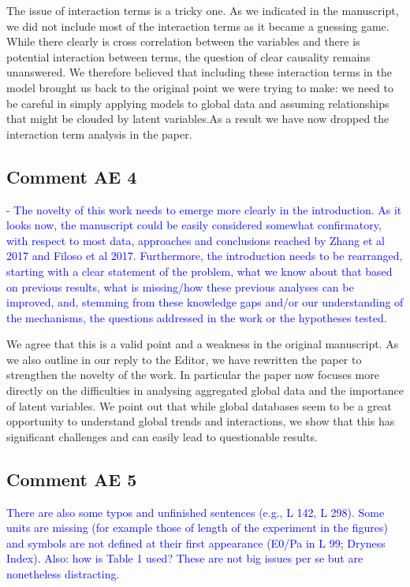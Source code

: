 \documentclass[]{elsarticle} %
\begin{document}
The issue of interaction terms is a tricky one. As we indicated in the manuscript, we did not include most of the interaction terms as it became a guessing game. While there clearly is cross correlation between the variables and there is potential interaction between terms, the question of clear causality remains unanswered. We therefore believed that including these interaction terms in the model brought us back to the original point we were trying to make: we need to be careful in simply applying models to global data and assuming relationships that might be clouded by latent variables.As a result we have now dropped the interaction term analysis in the paper.

\hypertarget{comment-ae-4}{%
\subsection{Comment AE 4}\label{comment-ae-4}}

\textcolor{blue}{- The novelty of this work needs to emerge more clearly in the introduction. As it looks now, the manuscript could be easily considered somewhat confirmatory, with respect to most data, approaches and conclusions reached by Zhang et al 2017 and Filoso et al 2017. Furthermore, the introduction needs to be rearranged, starting with a clear statement of the problem, what we know about that based on previous results, what is missing/how these previous analyses can be improved, and, stemming from these knowledge gaps and/or our understanding of the mechanisms, the questions addressed in the work or the hypotheses tested.}

We agree that this is a valid point and a weakness in the original manuscript. As we also outline in our reply to the Editor, we have rewritten the paper to strengthen the novelty of the work. In particular the paper now focuses more directly on the difficulties in analysing aggregated global data and the importance of latent variables. We point out that while global databases seem to be a great opportunity to understand global trends and interactions, we show that this has significant challenges and can easily lead to questionable results.

\hypertarget{comment-ae-5}{%
\subsection{Comment AE 5}\label{comment-ae-5}}

\textcolor{blue}{There are also some typos and unfinished sentences (e.g., L 142, L 298). Some units are missing (for example those of length of the experiment in the figures) and symbols are not defined at their first appearance (E0/Pa in L 99; Dryness Index). Also: how is Table 1 used? These are not big issues per se but are nonetheless distracting.}
\end{document}
